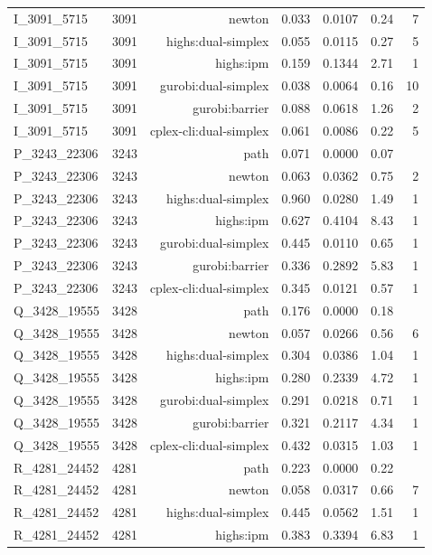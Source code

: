 \begin{longtable}{lrrrrrr}
I\_3091\_5715 & 3091 & newton & 0.033 & 0.0107 & 0.24 & 7 \\
I\_3091\_5715 & 3091 & highs:dual-simplex & 0.055 & 0.0115 & 0.27 & 5 \\
I\_3091\_5715 & 3091 & highs:ipm & 0.159 & 0.1344 & 2.71 & 1 \\
I\_3091\_5715 & 3091 & gurobi:dual-simplex & 0.038 & 0.0064 & 0.16 & 10 \\
I\_3091\_5715 & 3091 & gurobi:barrier & 0.088 & 0.0618 & 1.26 & 2 \\
I\_3091\_5715 & 3091 & cplex-cli:dual-simplex & 0.061 & 0.0086 & 0.22 & 5 \\
P\_3243\_22306 & 3243 & path & 0.071 & 0.0000 & 0.07 &  \\
P\_3243\_22306 & 3243 & newton & 0.063 & 0.0362 & 0.75 & 2 \\
P\_3243\_22306 & 3243 & highs:dual-simplex & 0.960 & 0.0280 & 1.49 & 1 \\
P\_3243\_22306 & 3243 & highs:ipm & 0.627 & 0.4104 & 8.43 & 1 \\
P\_3243\_22306 & 3243 & gurobi:dual-simplex & 0.445 & 0.0110 & 0.65 & 1 \\
P\_3243\_22306 & 3243 & gurobi:barrier & 0.336 & 0.2892 & 5.83 & 1 \\
P\_3243\_22306 & 3243 & cplex-cli:dual-simplex & 0.345 & 0.0121 & 0.57 & 1 \\
Q\_3428\_19555 & 3428 & path & 0.176 & 0.0000 & 0.18 &  \\
Q\_3428\_19555 & 3428 & newton & 0.057 & 0.0266 & 0.56 & 6 \\
Q\_3428\_19555 & 3428 & highs:dual-simplex & 0.304 & 0.0386 & 1.04 & 1 \\
Q\_3428\_19555 & 3428 & highs:ipm & 0.280 & 0.2339 & 4.72 & 1 \\
Q\_3428\_19555 & 3428 & gurobi:dual-simplex & 0.291 & 0.0218 & 0.71 & 1 \\
Q\_3428\_19555 & 3428 & gurobi:barrier & 0.321 & 0.2117 & 4.34 & 1 \\
Q\_3428\_19555 & 3428 & cplex-cli:dual-simplex & 0.432 & 0.0315 & 1.03 & 1 \\
R\_4281\_24452 & 4281 & path & 0.223 & 0.0000 & 0.22 &  \\
R\_4281\_24452 & 4281 & newton & 0.058 & 0.0317 & 0.66 & 7 \\
R\_4281\_24452 & 4281 & highs:dual-simplex & 0.445 & 0.0562 & 1.51 & 1 \\
R\_4281\_24452 & 4281 & highs:ipm & 0.383 & 0.3394 & 6.83 & 1 \\

\end{longtable}
